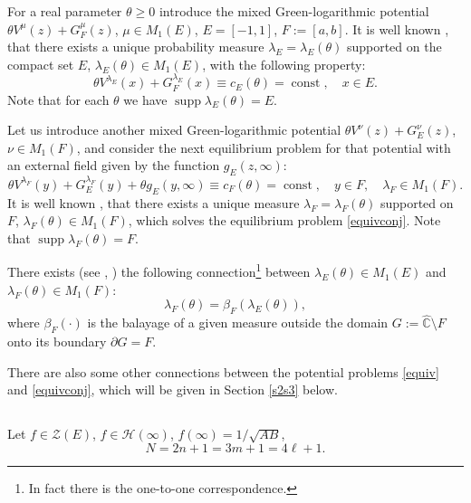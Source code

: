 \documentclass[11pt, a4paper, twoside]{article}
\let\geq\geqslant
\let\myh\widehat
\def\CC{\mathbb C}
\def\HH{\mathscr H}
\def\supp{\operatorname{supp}}
\def\const{\operatorname{const}}
\theoremstyle{plain}
\theoremstyle{definition}
\begin{document}
For a real parameter $\theta\geq0$ introduce the mixed Green-logarithmic potential $\theta V ^\mu(z) +G ^\mu_F(z)$, $\mu\in M_1(E)$,  $E=[-1,1]$, $F:=[a,b]$. It is well known \cite{GoRaSu91}, \cite{BuSu15} that there exists a unique probability measure $\lambda_E=\lambda_E(\theta)$ supported on the compact set $E$, $\lambda_E(\theta)\in M_1(E)$, with the following property:
\begin{equation}
\theta V^{\lambda_E}(x)+G^{\lambda_E}_F(x)
\equiv c_E(\theta)=\const,\quad x\in E.
\label{equiv}
\end{equation}
Note that for each $\theta$ we have $\supp{\lambda_E(\theta)}=E$.

Let us introduce another mixed Green-logarithmic potential 
$\theta V ^\nu(z) +G ^\nu_E(z)$, $\nu\in M_1(F)$, and consider  the next equilibrium problem  for that potential with an external field  given by the function $g_E(z,\infty)$:
\begin{equation}
\theta V^{\lambda_F}(y)+G^{\lambda_F}_E(y)
+\theta g_E(y,\infty)\equiv c_F(\theta)=\const,\quad y\in F,
\quad \lambda_F\in M_1(F).
\label{equivconj}
\end{equation}
It is well known  \cite{BuSu15}, \cite{Sue25}  that there exists a unique measure  $\lambda_F=\lambda_F(\theta)$ supported on $F$, $\lambda_F(\theta)\in M_1(F)$, which solves the equilibrium problem \eqref{equivconj}. Note that $\supp{\lambda_F}(\theta)=F$.

There exists (see \cite{BuSu15}, \cite{Sue25}) the following connection\footnote{In fact there is the one-to-one correspondence.} between $\lambda_E(\theta)\in M_1(E)$ and $\lambda_F(\theta)\in M_1(F)$:
\begin{equation}
\lambda_F(\theta)=\beta_F(\lambda_E(\theta)),
 \label{balay}
\end{equation}
where $\beta_F(\cdot)$ is the balayage  of a  given measure outside the domain $G:=\myh {\CC}\setminus{F}$ onto its boundary $\partial G=F$.

There are also some other connections between the potential problems \eqref{equiv} and \eqref{equivconj}, which will be given in Section \ref{s2s3} below.


\subsection{}\label{s1s2}
Let $f\in\mathscr Z(E)$, $f\in\HH(\infty)$, $f(\infty)=1/\sqrt{AB}$, 
\begin{equation}
N=2n+1=3m+1=4\ell+1.
\label{eqN}
\end{equation}
\end{document}
